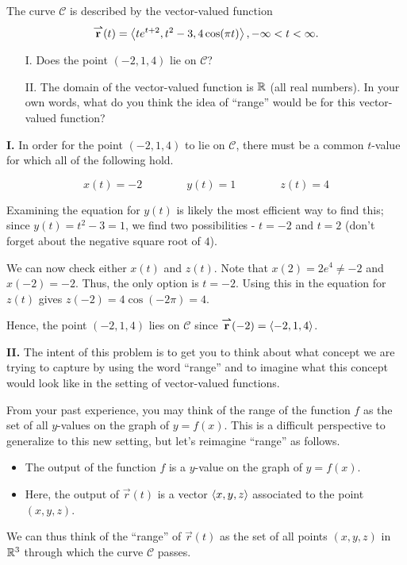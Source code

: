\documentclass[noauthor, handout]{ximera}
\begin{document}
\begin{problem}
The curve $\mathcal{C}$ is described by the vector-valued function $${\overset{\boldsymbol{\rightharpoonup}}{\mathbf{r}}}(t) = \left\langle te^{t+2}, t^2-3, 4\cos(\pi t)\right\rangle,  -\infty < t < \infty.$$ 

\begin{itemize}
\item[I.] Does the point $(-2,1,4)$ lie on $\mathcal{C}$?
\item[II.] The domain of the vector-valued function is $\mathbb R$ (all real numbers).  In your own words, what do you think the idea of ``range'' would be for this vector-valued function?
\end{itemize}

\begin{freeResponse}
\textbf{I.} In order for the point $(-2,1,4)$ to lie on $\mathcal{C}$, there must be a common $t$-value for which all of the following hold.

\[
x(t) = -2 \qquad \qquad y(t) =1 \qquad \qquad z(t)=4
\] 

Examining the equation for $y(t)$ is likely the most efficient way to find this; since $y(t) = t^2-3 = 1$, we find two possibilities - $t=-2$ and $t=2$ (don't forget about the negative square root of $4$).

We can now check either $x(t)$ and $z(t)$.  Note that $x(2) = 2e^4 \neq -2$ and $x(-2) = -2$.  Thus, the only option is $t=-2$.  Using this in the equation for $z(t)$ gives $z(-2) = 4\cos(-2\pi) =4$.  

Hence, the point $(-2,1,4)$ lies on $\mathcal{C}$ since ${\overset{\boldsymbol{\rightharpoonup}}{\mathbf{r}}}(-2) = \left\langle -2,1,4\right\rangle$.

\textbf{II.} The intent of this problem is to get you to think about what concept we are trying to capture by using the word ``range'' and to imagine what this concept would look like in the setting of vector-valued functions.

From your past experience, you may think of the range of the function $f$ as the set of all $y$-values on the graph of $y=f(x)$.  This is a difficult perspective to generalize to this new setting, but let's reimagine ``range'' as follows.

\begin{itemize}
\item  The output of the function $f$ is a $y$-value on the graph of $y=f(x)$.  
\item   Here, the output of $\vec{r}(t)$ is a vector $\left\langle x,y,z\right\rangle$ associated to the point $(x,y,z)$.
\end{itemize}

We can thus think of the ``range'' of $\vec{r}(t)$ as the set of all points $(x,y,z)$ in $\mathbb R^3$ through which the curve $\mathcal{C}$ passes.

\end{freeResponse}

\end{problem}
\end{document}
